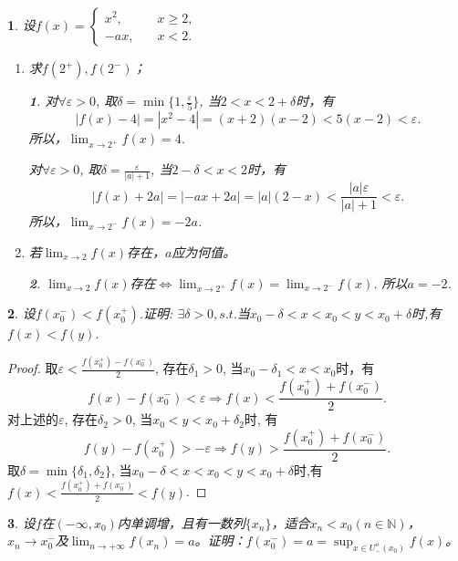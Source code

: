 \documentclass[utf8]{book}
\newtheorem{example}{}[section]             %
\newtheorem{solution}{}
\begin{document}
\begin{example}
设$f(x)=
\begin{cases}
x^2, \quad&x\geq2,\\
-ax, \quad&x<2.
\end{cases}
$
\renewcommand\labelenumi{\normalfont(\theenumi)}
\begin{enumerate}
\item 求$f(2^{+}), f(2^{-})$；
\begin{solution}对$\forall \varepsilon > 0$, 取$\delta=\min\{1, \frac{\varepsilon}{5}\}$, 当$2 < x < 2+\delta$时，有
$$|f(x)-4| = |x^2-4|=(x+2)(x-2)<5(x-2)< \varepsilon.$$
所以，$\displaystyle\lim_{x\to 2^{+}}f(x) = 4$. 

对$\forall \varepsilon > 0$, 取$\delta=\frac{\varepsilon}{|a|+1}$, 当$2-\delta < x < 2$时，有
$$|f(x) + 2a| = |-ax+2a| = |a|(2-x)<\frac{|a|\varepsilon}{|a|+ 1} < \varepsilon.$$
所以，$\displaystyle\lim_{x\to 2^{-}}f(x) = -2a$.
\end{solution}
\item 若$\displaystyle\lim_{x\to 2}f(x)$存在，$a$应为何值。
\begin{solution}
$\displaystyle\lim_{x\to 2}f(x)$存在$\iff \displaystyle\lim_{x\to 2^{+}}f(x) = \displaystyle\lim_{x\to 2^{-}}f(x)$. 所以$a=-2$.
\end{solution}
\end{enumerate}
\end{example}
\begin{example}
设$f(x_0^-)<f(x_0^+)$.证明: $\exists \delta > 0, s.t.$当$x_0-\delta<x<x_0<y<x_0+\delta$时,有$f(x)<f(y)$.
\end{example}
\begin{proof}取$\varepsilon < \displaystyle\frac{f(x_0^+)-f(x_0^-)}{2}$, 存在$\delta_1 > 0$, 当$x_0-\delta_1 < x < x_0$时，有
$$f(x) - f(x_0^-) < \varepsilon \Rightarrow f(x) < \frac{f(x_0^+)+f(x_0^-)}{2}.$$
对上述的$\varepsilon$, 存在$\delta_2 > 0$, 当$x_0 < y < x_0+\delta_2$时, 有
$$f(y) - f(x_0^+) >-\varepsilon \Rightarrow f(y) > \frac{f(x_0^+)+f(x_0^-)}{2}.$$
取$\delta = \min\{\delta_1,\delta_2\}$, 当$x_0-\delta<x<x_0<y<x_0+\delta$时,有$f(x)<\displaystyle\frac{f(x_0^+)+f(x_0^-)}{2}<f(y)$.
\end{proof}
\begin{example}
设$f$在$(-\infty, x_0)$内单调增，且有一数列$\{x_n\}$，适合$x_n<x_0(n\in\mathbb{N})$，$x_n\to x^-_0$及$\displaystyle\lim_{n\to +\infty}f(x_n)=a$。证明：$f(x_0^-)=a=\displaystyle\sup_{x\in U_{-}^o(x_0)}f(x)$。
\end{example}
\end{document}
